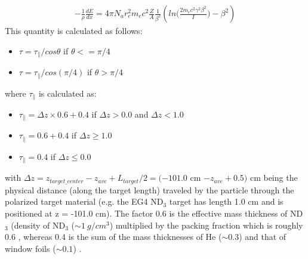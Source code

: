 \begin{eqnarray}
\label{eqBetheBlock}
-\frac{1}{\rho} \frac{dE}{dx} = 4\pi N_a r_e^2 m_e c^2 \frac{Z}{A} \frac{1}{\beta^2} \left( ln\bigg( \frac{2m_ec^2\gamma^2\beta^2}{I} \bigg) - \beta^2 \right) 
\end{eqnarray}
This quantity is calculated as follows:
\begin{itemize}
\item $\tau = \tau_{\parallel}/cos\theta$ \quad if $\theta <= \pi/4$
\item $\tau = \tau_{\parallel}/cos(\pi/4)$ \quad if $\theta > \pi/4$    %
\end{itemize}
where $\tau_{\parallel}$ is calculated as:
\begin{itemize}
\item $\tau_{\parallel} = \Delta z \times 0.6 + 0.4$ \quad if $\Delta z > 0.0 $ and $\Delta z < 1.0 $
\item $\tau_{\parallel} = 0.6 + 0.4$ \quad if $\Delta z \geq  1.0$
\item $\tau_{\parallel} = 0.4$ \quad if $\Delta z \leq  0.0$
\end{itemize}
with $\Delta z = z_{target\_center} - z_{ave} + L_{target}/2 = (-101.0$ cm $ - z_{ave} + 0.5)$ cm being the physical distance (along the target length) traveled by the particle through the polarized target material (e.g. the EG4 ND$_3$ target has length 1.0 cm and is positioned at z = -101.0 cm). The factor 0.6 is the effective mass thickness of ND$_3$ (density of ND$_3$ ($\sim 1 ~g/cm^3$) %
multiplied by the packing fraction which is roughly 0.6  \cite{rfersch_th}, whereas 0.4 is the sum of the mass thicknesses of He ($\sim 0.3$) and that of window foils ($\sim 0.1$) \cite{nGuler_th}. %


    
